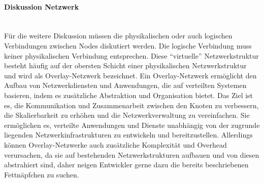 \documentclass[../vs-script-first-v01.tex]{subfiles}
\begin{document}
\paragraph{Diskussion Netzwerk}\mbox{}\\
Für die weitere Diskussion müssen die physikalischen oder auch logischen Verbindungen zwischen Nodes diskutiert werden. Die logische Verbindung muss keiner physikalischen Verbindung entsprechen. Diese \enquote{virtuelle} Netzwerkstruktur besteht häufig auf der obersten Schicht einer physikalischen Netzwerkstruktur und wird als Overlay-Netzwerk bezeichnet. Ein Overlay-Netzwerk ermöglicht den Aufbau von Netzwerkdiensten und Anwendungen, die auf verteilten Systemen basieren, indem es zusätzliche Abstraktion und Organisation bietet. Das Ziel ist es, die Kommunikation und Zusammenarbeit zwischen den Knoten zu verbessern, die Skalierbarkeit zu erhöhen und die Netzwerkverwaltung zu vereinfachen. Sie ermöglichen es, verteilte Anwendungen und Dienste unabhängig von der zugrunde liegenden Netzwerkinfrastrukturen zu entwickeln und bereitzustellen. Allerdings können Overlay-Netzwerke auch zusätzliche Komplexität und Overhead verursachen, da sie auf bestehenden Netzwerkstrukturen aufbauen und von diesen abstrahiert sind, daher neigen Entwickler gerne dazu die bereits beschriebenen Fettnäpfchen zu suchen.
\end{document}
